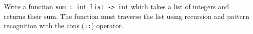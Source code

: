 Write a function \lstinline{sum : int list -> int} which takes a list of integers and returns their sum. The function must traverse the list using recursion and pattern recognition with the cons (\lstinline{::}) operator. 
